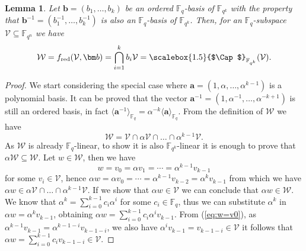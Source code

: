 \documentclass{article}
\newtheorem{lemma}{Lemma}
\newcommand{\Fq}{\mathbb{F}_{q}}
\newcommand{\Fqn}{\mathbb{F}_{q^n}}
\newcommand{\Fqk}{\mathbb{F}_{q^k}}
\newcommand{\calW}{\mathcal{W}}
\newcommand{\calV}{\mathcal{V}}
\newcommand{\fred}{f_{\mathrm{red}}}
\newcommand{\Span}[2]{\langle #2 \rangle_{#1}}
\newcommand{\Core}[1]{\mathop{\scalebox{1.5}{$\Cap$}}\nolimits_{\mathbb{F}_{q^k}}(#1)}
\begin{document}
\begin{lemma}
\label{lm:random_red_to_Fqk_linear}
    Let $\bm b= (b_1, \ldots, b_k)$ be an ordered $\Fq$-basis of $\Fqk$ with the property that $\bm b^{-1}= (b_1^{-1}, \ldots, b_k^{-1})$ is also an $\Fq$-basis of $\Fqk$. Then, for an $\Fq$-subspace $\calV\subseteq\Fqn$ we have
    $$
        \calW = \fred(\calV, \bm b)= \bigcap_{i=1}^k b_i \calV = \Core{\calV}.
    $$
\end{lemma}
\begin{proof}
    We start considering the special case where $\bm a = (1, \alpha, \ldots, \alpha^{k-1})$ is a polynomial basis.
    It can be proved that the vector $\bm a^{-1} = (1, \alpha^{-1}, \ldots, \alpha^{-k + 1})$ is still an ordered basis, in fact $\Span{\Fq}{\bm a^{-1}} = \alpha^{-k}\Span{\Fq}{\bm a}$. From the definition of $\calW$ we have
    $$
        \calW = \calV \cap \alpha \calV \cap \ldots \cap \alpha^{k-1} \calV.
    $$
    As $\calW$ is already $\Fq$-linear, to show it is also $\Fqk$-linear it is enough to prove that $\alpha \calW \subseteq \calW$.
    Let $w \in \calW$, then we have 
    \begin{equation}
    \label{eq:w=v0}
    w = v_0 = \alpha v_1 = \cdots = \alpha^{k-1} v_{k-1}
    \end{equation}
    for some $v_i \in \calV$, hence $\alpha w = \alpha v_0 = \cdots = \alpha^{k-1} v_{k-2} = \alpha^k v_{k-1}$
    from which we have $\alpha w \in \alpha \calV \cap \ldots \cap \alpha^{k-1} \calV$. 
    If we show that $\alpha w \in \calV$ we can conclude that $\alpha w \in \calW$.
    We know that $\alpha^k = \sum_{i=0}^{k-1} c_i \alpha^i$ for some $c_i \in \Fq$, thus we can substitute $\alpha^k$ in $\alpha w = \alpha^k v_{k-1}$, obtaining $ \alpha w =\sum_{i=0}^{k-1} c_i \alpha^i v_{k-1}$. From (\ref{eq:w=v0}), as $\alpha^{k-1} v_{k-1} = \alpha^{k-1-i} v_{k-1-i}$, we also have $\alpha^{i} v_{k-1} = v_{k-1-i} \in \calV$ it follows that $\alpha w = \sum_{i=0}^{k-1} c_i v_{k-1-i} \in \calV$.
    

\end{proof}
\end{document}
